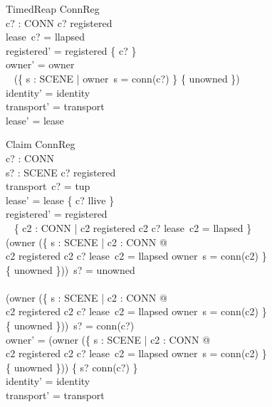 \documentclass[a4paper,10pt,fleqn]{article}
\begin{document}
\begin{schema}{TimedReap}
  \Delta ConnReg \\
  c? : CONN
\where
  c? \in registered \\
  lease~c? = llapsed \\
  registered' = registered \setminus \{ c? \} \\
  owner' = owner \oplus \\
  \quad~ (\{ s : SCENE | owner~s = conn(c?) \} \cross \{ unowned \}) \\
  identity' = identity \\
  transport' = transport \\
  lease' = lease
\end{schema}

\begin{schema}{Claim}
  \Delta ConnReg \\
  c? : CONN \\
  s? : SCENE
\where
  c? \in registered \\
  transport~c? = tup \\
  lease' = lease \oplus \{ c? \mapsto llive \} \\
  registered' = registered \setminus \\
  \quad~ \{ c2 : CONN | c2 \in registered \land c2 \neq c? \land
    lease~c2 = llapsed \} \\
  (owner \oplus (\{ s : SCENE | \exists c2 : CONN @ \\
    \qquad c2 \in registered \land c2 \neq c? \land lease~c2 = llapsed
    \land owner~s = conn(c2) \} \\
    \qquad \cross \{ unowned \}))~s? = unowned \\
  \lor \\
  (owner \oplus (\{ s : SCENE | \exists c2 : CONN @ \\
    \qquad c2 \in registered \land c2 \neq c? \land lease~c2 = llapsed
    \land owner~s = conn(c2) \} \\
    \qquad \cross \{ unowned \}))~s? = conn(c?) \\
  owner' = (owner \oplus (\{ s : SCENE | \exists c2 : CONN @ \\
    \qquad c2 \in registered \land c2 \neq c? \land lease~c2 = llapsed
    \land owner~s = conn(c2) \} \\
    \qquad \cross \{ unowned \})) \oplus \{ s? \mapsto conn(c?) \} \\
  identity' = identity \\
  transport' = transport
\end{schema}
\end{document}
